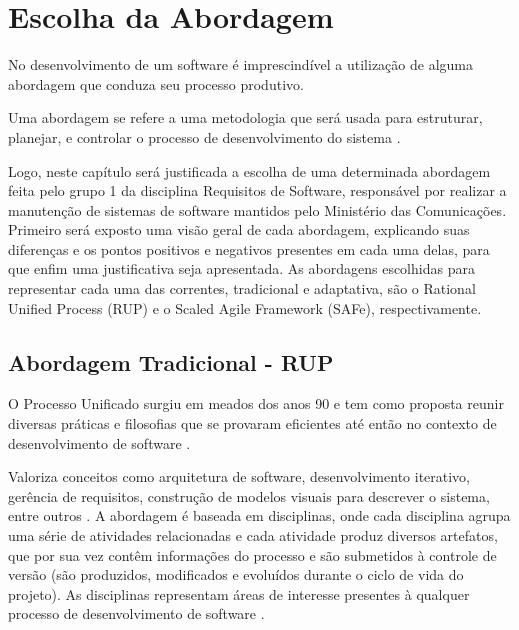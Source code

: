 \chapter[Escolha da Abordagem]{Escolha da Abordagem}
No desenvolvimento de um software é imprescindível a utilização de alguma abordagem que conduza seu processo produtivo.

Uma abordagem se refere a uma metodologia que será usada para estruturar, planejar, e controlar o processo de desenvolvimento do sistema \cite{CMS001}.

Logo, neste capítulo será justificada a escolha de uma determinada abordagem feita pelo grupo 1 da disciplina Requisitos de Software, responsável por realizar a manutenção de sistemas de software mantidos pelo Ministério das Comunicações. Primeiro será exposto uma visão geral de cada abordagem, explicando suas diferenças e os pontos positivos e negativos presentes em cada uma delas, para que enfim uma justificativa seja apresentada. As abordagens escolhidas para representar cada uma das correntes, tradicional e adaptativa, são o Rational Unified Process (RUP) e o Scaled Agile Framework (SAFe), respectivamente.

\section{Abordagem Tradicional - RUP}
O Processo Unificado surgiu em meados dos anos 90 e tem como proposta reunir diversas práticas e filosofias que se provaram eficientes até então no contexto de desenvolvimento de software \cite{kruchten001}.

Valoriza conceitos como arquitetura de software, desenvolvimento iterativo, gerência de requisitos, construção de modelos visuais para descrever o sistema, entre outros \cite{kruchten001}. A abordagem é baseada em disciplinas, onde cada disciplina agrupa uma série de atividades relacionadas e cada atividade produz diversos artefatos, que por sua vez contêm informações do processo e são submetidos à controle de versão (são produzidos, modificados e evoluídos durante o ciclo de vida do projeto). As disciplinas representam áreas de interesse presentes à qualquer processo de desenvolvimento de software \cite{kruchten001}.


